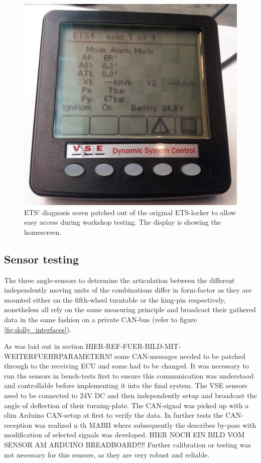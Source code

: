 \documentclass[ExampleMasters.tex]{subfiles}
\begin{document}
\begin{figure}[h]
\centering
\includegraphics[width=0.6\linewidth]{figures/ETS_display_homescreen}
\caption{\gls{ETS}' diagnosis sceen patched out of the original ETS-locker to allow easy access during workshop testing. The display is showing the homescreen.}
\label{fig:ETS_display_homescreen}
\end{figure}


\subsection{Sensor testing}

The three angle-sensors to determine the articulation between the different independently moving units of the combinations differ in form-factor as they are mounted either on the fifth-wheel turntable or the king-pin respectively, nonetheless all rely on the same measuring principle and broadcast their gathered data in the same fashion on a private \gls{CAN}-bus (refer to figure \ref{fig:dolly_interfaces}). 

As was laid out in section HIER-REF-FUER-BILD-MIT-WEITERFUEHRPARAMETERN! some CAN-messages needed to be patched through to the receiving \gls{ECU} and some had to be changed. It was necessary to run the sensors in bench-tests first to ensure this communication was understood and controllable before implementing it into the final system. The \gls{VSE} sensors need to be connected to 24V \gls{DC} and then independently setup and broadcast the angle of deflection of their turning-plate. The CAN-signal was picked up with a slim Arduino CAN-setup at first to verify the data. In further tests the \gls{CAN}-reception was realized n th \gls{MABII} where subsequently the describes by-pass with modification of selected signals was developed. HIER NOCH EIN BILD VOM SENSOR AM ARDUINO BREADBOARD!!!! Further calibration or testing was not necessary for this sensors, as they are very robust and reliable. 
\end{document}

